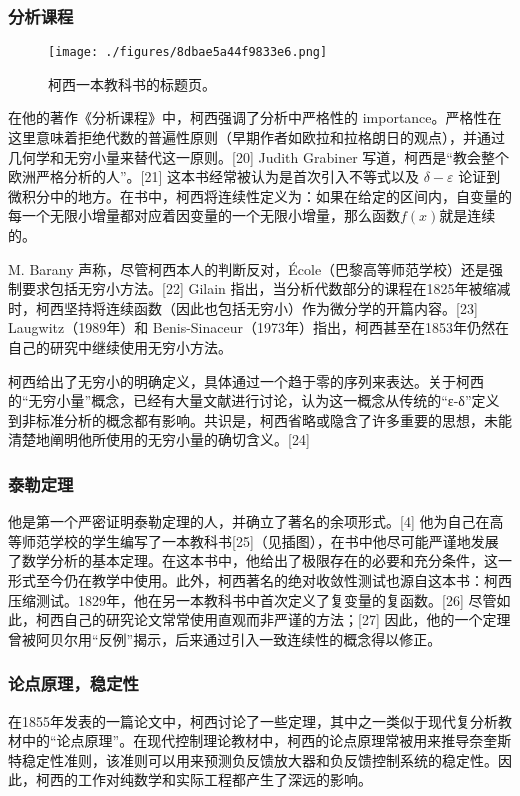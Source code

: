 \subsubsection{分析课程}
\begin{figure}[ht]
\centering
\texttt{[image: ./figures/8dbae5a44f9833e6.png]}
\caption{柯西一本教科书的标题页。} \label{fig_August_3}
\end{figure}
在他的著作《分析课程》中，柯西强调了分析中严格性的 importance。严格性在这里意味着拒绝代数的普遍性原则（早期作者如欧拉和拉格朗日的观点），并通过几何学和无穷小量来替代这一原则。[20] Judith Grabiner 写道，柯西是“教会整个欧洲严格分析的人”。[21] 这本书经常被认为是首次引入不等式以及 \(\delta - \varepsilon\) 论证到微积分中的地方。在书中，柯西将连续性定义为：如果在给定的区间内，自变量的每一个无限小增量都对应着因变量的一个无限小增量，那么函数\(f(x)\)就是连续的。

M. Barany 声称，尽管柯西本人的判断反对，École（巴黎高等师范学校）还是强制要求包括无穷小方法。[22] Gilain 指出，当分析代数部分的课程在1825年被缩减时，柯西坚持将连续函数（因此也包括无穷小）作为微分学的开篇内容。[23] Laugwitz（1989年）和 Benis-Sinaceur（1973年）指出，柯西甚至在1853年仍然在自己的研究中继续使用无穷小方法。

柯西给出了无穷小的明确定义，具体通过一个趋于零的序列来表达。关于柯西的“无穷小量”概念，已经有大量文献进行讨论，认为这一概念从传统的“ε-δ”定义到非标准分析的概念都有影响。共识是，柯西省略或隐含了许多重要的思想，未能清楚地阐明他所使用的无穷小量的确切含义。[24]
\subsubsection{泰勒定理}
他是第一个严密证明泰勒定理的人，并确立了著名的余项形式。[4] 他为自己在高等师范学校的学生编写了一本教科书[25]（见插图），在书中他尽可能严谨地发展了数学分析的基本定理。在这本书中，他给出了极限存在的必要和充分条件，这一形式至今仍在教学中使用。此外，柯西著名的绝对收敛性测试也源自这本书：柯西压缩测试。1829年，他在另一本教科书中首次定义了复变量的复函数。[26] 尽管如此，柯西自己的研究论文常常使用直观而非严谨的方法；[27] 因此，他的一个定理曾被阿贝尔用“反例”揭示，后来通过引入一致连续性的概念得以修正。
\subsubsection{论点原理，稳定性}
在1855年发表的一篇论文中，柯西讨论了一些定理，其中之一类似于现代复分析教材中的“论点原理”。在现代控制理论教材中，柯西的论点原理常被用来推导奈奎斯特稳定性准则，该准则可以用来预测负反馈放大器和负反馈控制系统的稳定性。因此，柯西的工作对纯数学和实际工程都产生了深远的影响。
